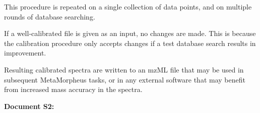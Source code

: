 \documentclass{article}
\begin{document}
This procedure is repeated on a single collection of data points, and on multiple rounds of database searching. 

If a well-calibrated file is given as an input, no changes are made. This is because the calibration procedure only accepts changes if a test database search results in improvement.

Resulting calibrated spectra are written to an mzML file that may be used in subsequent MetaMorpheus tasks, or in any external software that may benefit from increased mass accuracy in the spectra.

\newpage

{\huge \textbf{Document S2:} }
\end{document}
